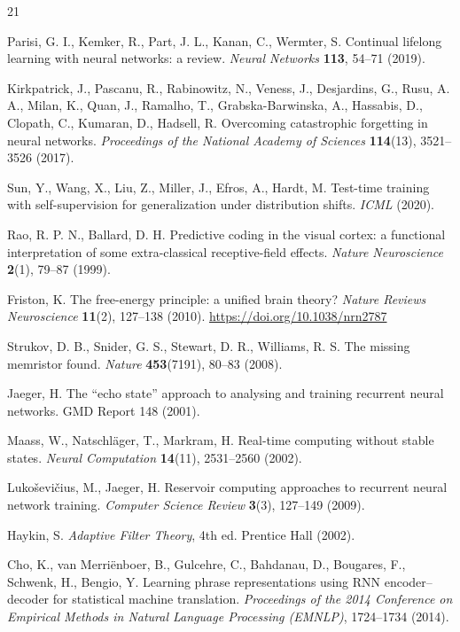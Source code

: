 \documentclass[11pt]{article}
\begin{document}
\begin{thebibliography}{21}

 Parisi, G. I., Kemker, R., Part, J. L., Kanan, C.,
Wermter, S. Continual lifelong learning with neural networks: a review.
\emph{Neural Networks} \textbf{113}, 54--71 (2019).

 Kirkpatrick, J., Pascanu, R., Rabinowitz, N.,
Veness, J., Desjardins, G., Rusu, A. A., Milan, K., Quan, J., Ramalho, T.,
Grabska-Barwinska, A., Hassabis, D., Clopath, C., Kumaran, D., Hadsell, R.
Overcoming catastrophic forgetting in neural networks. \emph{Proceedings of
the National Academy of Sciences} \textbf{114}(13), 3521--3526 (2017).

 Sun, Y., Wang, X., Liu, Z., Miller, J., Efros, A., Hardt, M.
Test-time training with self-supervision for generalization under distribution
shifts. \emph{ICML} (2020).

 Rao, R. P. N., Ballard, D. H. Predictive coding in the visual
cortex: a functional interpretation of some extra-classical receptive-field
effects. \emph{Nature Neuroscience} \textbf{2}(1), 79--87 (1999).

 Friston, K. The free-energy principle: a unified brain
theory? \emph{Nature Reviews Neuroscience} \textbf{11}(2), 127--138 (2010).
\url{https://doi.org/10.1038/nrn2787}

 Strukov, D. B., Snider, G. S., Stewart, D. R.,
Williams, R. S. The missing memristor found. \emph{Nature} \textbf{453}(7191),
80--83 (2008).

 Jaeger, H. The ``echo state'' approach to analysing and
training recurrent neural networks. GMD Report 148 (2001).

 Maass, W., Natschläger, T., Markram, H. Real-time computing
without stable states. \emph{Neural Computation} \textbf{14}(11), 2531--2560
(2002).

 Luko\v{s}evi\v{c}ius, M., Jaeger, H. Reservoir
computing approaches to recurrent neural network training. \emph{Computer
Science Review} \textbf{3}(3), 127--149 (2009).

 Haykin, S. \emph{Adaptive Filter Theory}, 4th ed.
Prentice Hall (2002).

 Cho, K., van Merri\"enboer, B., Gulcehre, C., Bahdanau, D.,
Bougares, F., Schwenk, H., Bengio, Y. Learning phrase representations using
RNN encoder--decoder for statistical machine translation. \emph{Proceedings of
the 2014 Conference on Empirical Methods in Natural Language Processing
(EMNLP)}, 1724--1734 (2014).


\end{thebibliography}
\end{document}
